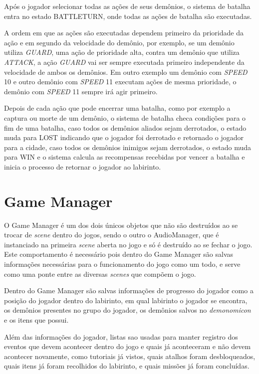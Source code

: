 \documentclass[
	12pt,				%
	openright,			%
	twoside,			%
	a4paper,			%
	english,			%
	french,				%
	spanish,			%
	brazil				%
	]{abntex2}
\begin{document}
	Após o jogador selecionar todas as ações de seus demônios, o sistema de batalha entra no  estado BATTLETURN, onde todas as ações de batalha são executadas.
	
	A ordem em que as ações são executadas dependem primeiro da prioridade da ação e em segundo da velocidade do demônio, por exemplo, se um demônio utiliza \emph{GUARD}, uma ação de prioridade alta, contra um demônio que utiliza \emph{ATTACK}, a ação \emph{GUARD} vai ser sempre executada primeiro independente da velocidade de ambos os demônios. Em outro exemplo um demônio com \emph{SPEED} 10 e outro demônio com \emph{SPEED} 11 executam ações de mesma prioridade, o demônio com \emph{SPEED} 11 sempre irá agir primeiro.

	Depois de cada ação que pode encerrar uma batalha, como por exemplo a captura ou morte de um demônio, o sistema de batalha checa condições para o fim de uma batalha, caso todos os demônios aliados sejam derrotados, o estado muda para LOST indicando que o jogador foi derrotado e retornado o jogador para a cidade, caso todos os demônios inimigos sejam derrotados, o estado muda para WIN e o sistema calcula as recompensas recebidas por vencer a batalha e inicia o processo de retornar o jogador ao labirinto.

\section{Game Manager}

	O Game Manager é um dos dois únicos objetos que não são destruídos ao se trocar de \emph{scene} dentro do jogos, sendo o outro o AudioManager, que é instanciado na primeira \emph{scene} aberta no jogo e só é destruído ao se fechar o jogo. Este comportamento é necessário pois dentro do Game Manager são salvas informações necessárias para o funcionamento do jogo como um todo, e serve como uma ponte entre as diversas \emph{scenes} que compõem o jogo.
	
	Dentro do Game Manager são salvas informações de progresso do jogador como a posição do jogador dentro do labirinto, em qual labirinto o jogador se encontra, os demônios presentes no grupo do jogador, os demônios salvos no \emph{demonomicon} e os itens que possui.
	
	Além das informações do jogador, listas sao usadas para manter registro dos eventos que devem acontecer dentro do jogo e quais já aconteceram e não devem acontecer novamente, como tutoriais já vistos, quais atalhos foram desbloqueados, quais itens já foram recolhidos do labirinto, e quais missões já foram concluídas.
	
\end{document}
